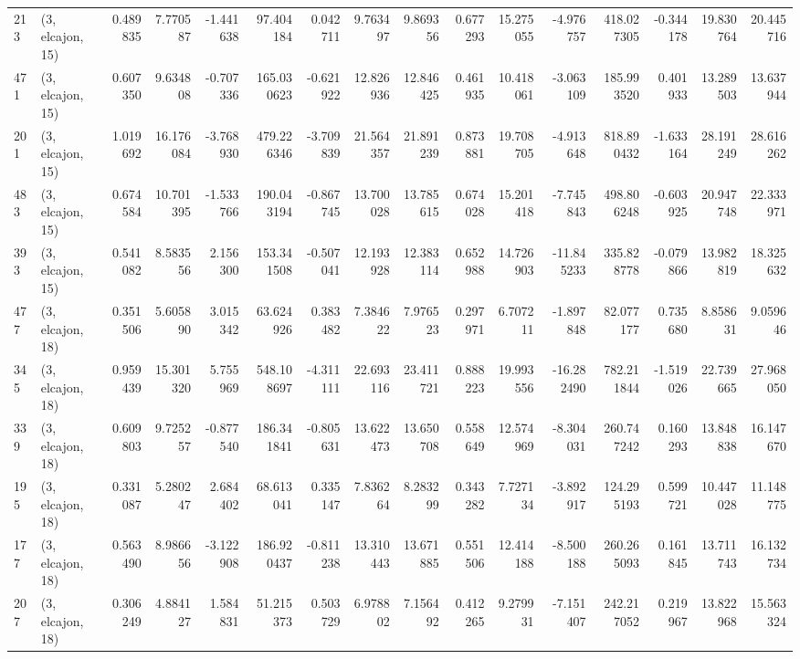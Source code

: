 \begin{tabular}{llrrrrrrrrrrrrrr}
213 &  (3, elcajon, 15) &   0.489835 &   7.770587 &  -1.441638 &    97.404184 &   0.042711 &   9.763497 &   9.869356 &  0.677293 &  15.275055 &  -4.976757 &   418.027305 &  -0.344178 &  19.830764 &  20.445716 \\
471 &  (3, elcajon, 15) &   0.607350 &   9.634808 &  -0.707336 &   165.030623 &  -0.621922 &  12.826936 &  12.846425 &  0.461935 &  10.418061 &  -3.063109 &   185.993520 &   0.401933 &  13.289503 &  13.637944 \\
201 &  (3, elcajon, 15) &   1.019692 &  16.176084 &  -3.768930 &   479.226346 &  -3.709839 &  21.564357 &  21.891239 &  0.873881 &  19.708705 &  -4.913648 &   818.890432 &  -1.633164 &  28.191249 &  28.616262 \\
483 &  (3, elcajon, 15) &   0.674584 &  10.701395 &  -1.533766 &   190.043194 &  -0.867745 &  13.700028 &  13.785615 &  0.674028 &  15.201418 &  -7.745843 &   498.806248 &  -0.603925 &  20.947748 &  22.333971 \\
393 &  (3, elcajon, 15) &   0.541082 &   8.583556 &   2.156300 &   153.341508 &  -0.507041 &  12.193928 &  12.383114 &  0.652988 &  14.726903 & -11.845233 &   335.828778 &  -0.079866 &  13.982819 &  18.325632 \\
477 &  (3, elcajon, 18) &   0.351506 &   5.605890 &   3.015342 &    63.624926 &   0.383482 &   7.384622 &   7.976523 &  0.297971 &   6.707211 &  -1.897848 &    82.077177 &   0.735680 &   8.858631 &   9.059646 \\
345 &  (3, elcajon, 18) &   0.959439 &  15.301320 &   5.755969 &   548.108697 &  -4.311111 &  22.693116 &  23.411721 &  0.888223 &  19.993556 & -16.282490 &   782.211844 &  -1.519026 &  22.739665 &  27.968050 \\
339 &  (3, elcajon, 18) &   0.609803 &   9.725257 &  -0.877540 &   186.341841 &  -0.805631 &  13.622473 &  13.650708 &  0.558649 &  12.574969 &  -8.304031 &   260.747242 &   0.160293 &  13.848838 &  16.147670 \\
195 &  (3, elcajon, 18) &   0.331087 &   5.280247 &   2.684402 &    68.613041 &   0.335147 &   7.836264 &   8.283299 &  0.343282 &   7.727134 &  -3.892917 &   124.295193 &   0.599721 &  10.447028 &  11.148775 \\
177 &  (3, elcajon, 18) &   0.563490 &   8.986656 &  -3.122908 &   186.920437 &  -0.811238 &  13.310443 &  13.671885 &  0.551506 &  12.414188 &  -8.500188 &   260.265093 &   0.161845 &  13.711743 &  16.132734 \\
207 &  (3, elcajon, 18) &   0.306249 &   4.884127 &   1.584831 &    51.215373 &   0.503729 &   6.978802 &   7.156492 &  0.412265 &   9.279931 &  -7.151407 &   242.217052 &   0.219967 &  13.822968 &  15.563324 \\

\end{tabular}
